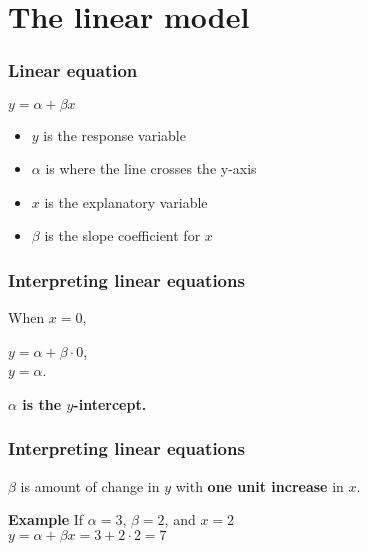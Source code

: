 \documentclass{beamer}
\begin{document}
\section{The linear model}
\begin{frame}
  \frametitle{Linear equation}
  \begin{centering}
    $y = \alpha + \beta x$\\
  \end{centering} \vspace{1cm}
  \begin{itemize}
    \item $y$ is the response variable
    \item $\alpha$ is where the line crosses the y-axis
    \item $x$ is the explanatory variable
    \item $\beta$ is the slope coefficient for $x$
  \end{itemize}
\end{frame}
\begin{frame}
  \frametitle{Interpreting linear equations}
  When $x = 0$, \\ \vspace{0.5cm}
  \begin{centering}
  $y = \alpha + \beta \cdot 0$, \\
  $y = \alpha$. \\ \vspace{0.5cm}
\end{centering}
  \textbf{$\alpha$ is the $y$-intercept.}
\end{frame}
\begin{frame}
  \frametitle{Interpreting linear equations}
  $\beta$ is amount of change in $y$ with \textbf{one unit increase} in $x$. \\ \vspace{0.5cm}
  \begin{block}{\textbf{Example}}
  If $\alpha = 3$, $\beta = 2$, and $x = 2$ \\ \vspace{0.5cm}
  \centering
  $y = \alpha + \beta x = 3 + 2\cdot2 = 7$
\end{block}
\end{frame}
\end{document}
